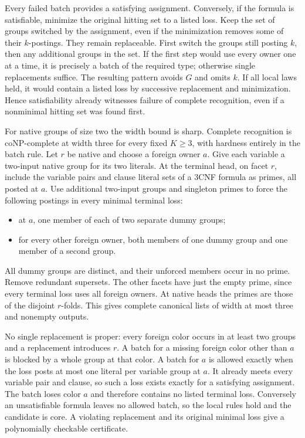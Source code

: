 Every failed batch provides a satisfying assignment.
Conversely, if the formula is satisfiable, minimize
the original hitting set to a listed loss. Keep the
set of groups switched by the assignment, even if
the minimization removes some of their $k$-postings.
They remain replaceable. First switch the groups
still posting $k$, then any additional groups in the
set. If the first step would use every owner one at
a time, it is precisely a batch of the required type;
otherwise single replacements suffice. The resulting
pattern avoids $G$ and omits $k$. If all local laws
held, it would contain a listed loss by successive
replacement and minimization. Hence satisfiability
already witnesses failure of complete recognition,
even if a nonminimal hitting set was found first.

For native groups of size two the width bound is
sharp. Complete recognition is coNP-complete at
width three for every fixed $K\ge3$, with hardness
entirely in the batch rule. Let $r$ be native and
choose a foreign owner $a$. Give each variable a
two-input native group for its two literals. At the
terminal head, on facet $r$, include the variable
pairs and clause literal sets of a 3CNF formula as
primes, all posted at $a$. Use additional two-input
groups and singleton primes to force the following
postings in every minimal terminal loss:
\begin{itemize}
\item at $a$, one member of each of two separate
dummy groups;
\item for every other foreign owner, both members
of one dummy group and one member of a second group.
\end{itemize}
All dummy groups are distinct, and their unforced
members occur in no prime. Remove redundant
supersets. The other facets have just the empty
prime, since every terminal loss uses all foreign
owners. At native heads the primes are those of
the disjoint $r$-folds. This gives complete canonical
lists of width at most three and nonempty outputs.

No single replacement is proper: every foreign
color occurs in at least two groups and a replacement
introduces $r$. A batch for a missing foreign
color other than $a$ is blocked by a whole group
at that color. A batch for $a$ is allowed exactly
when the loss posts at most one literal per variable
group at $a$. It already meets every variable pair
and clause, so such a loss exists exactly for a
satisfying assignment. The batch loses color $a$
and therefore contains no listed terminal loss.
Conversely an unsatisfiable formula leaves no
allowed batch, so the local rules hold and the
candidate is core. A violating replacement and its
original minimal loss give a polynomially checkable
certificate.


